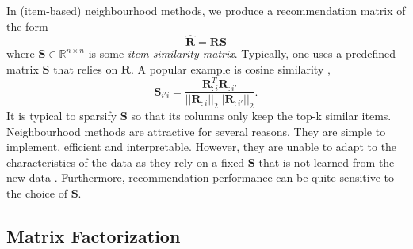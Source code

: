 \documentclass{article}
\newcommand{\citep}{\cite}
\newcommand{\Real}{\mathbb{R}}
\newcommand{\R}{\mathbf{R}}
\newcommand{\RHat}{\hat{\mathbf{R}}}
\newcommand{\Sim}{\mathbf{S}}
\newcommand{\numItems}{n}
\newcommand{\itemSet}{\mathcal{I}}
\renewcommand{\u}{u}
\renewcommand{\i}{i}
\newcommand{\ui}{\u\i}
\newcommand{\predUserItem}{\RHat_{\ui}}
\begin{document}
In (item-based) neighbourhood methods, we produce a recommendation matrix of the form
\begin{equation}
\label{eqn:knn}
\RHat = \R \Sim
\end{equation}
where $\Sim \in \Real^{\numItems \times \numItems}$ is some \emph{item-similarity matrix}.
Typically, one uses a predefined matrix $\Sim$ that relies on $\R$. A popular example is cosine similarity \citep{Sarwar:2001,Linden:2003},
$$ \Sim_{\i' \i} = \frac{ \R_{:\i}^T \R_{:\i'} }{|| \R_{:\i} ||_2 || \R_{:\i'} ||_2}. $$
It is typical to sparsify $\Sim$ so that its columns only keep the top-k similar items. Neighbourhood methods are attractive for several reasons.
They are simple to implement, efficient and interpretable. However, they are unable to adapt to the characteristics of the data as they rely on a fixed $\Sim$ that is not learned from the new data \citep{Koren:2008b}. Furthermore, recommendation performance can be quite sensitive to the choice of $\Sim$.

\subsection{Matrix Factorization}
\end{document}

